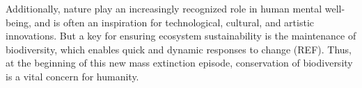 \documentclass[12pt,a4paper]{article}
\begin{document}
Additionally, nature play an increasingly recognized role in human mental well-being, and is often an inspiration for technological, cultural, and artistic innovations.
But a key for ensuring ecosystem sustainability is the maintenance of biodiversity, which enables quick and dynamic responses to change (REF).
Thus, at the beginning of this new mass extinction episode, conservation of biodiversity is a vital concern for humanity.
%
\end{document}
